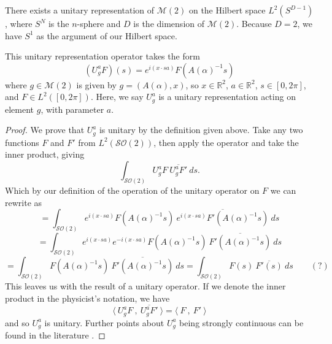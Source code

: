 \documentclass{article}
\begin{document}
\begin{theorem}
    There exists a unitary representation of $\mathcal{M}(2)$ on the Hilbert space ${L}^{2}(S^{D-1})$, where $S^{N}$ is the $n$-sphere and $D$ is the dimension of $\mathcal{M}(2)$. Because $D=2$, we have $S^{1}$ as the argument of our Hilbert space.

    This unitary representation operator takes the form
    \[%
        (U^{a}_{g}F)(s) = e^{i(x \cdot sa)}F(A(\alpha)^{-1}s)
    \]%
    where $g \in \mathcal{M}(2)$ is given by $g = (A(\alpha), x)$, so $x \in \mathbb{R}^{2}$, $a \in \mathbb{R}^{2}$, $s \in [0,2\pi]$,  and $F \in L^{2}([0,2\pi])$. Here, we say $U^{a}_{g}$ is a unitary representation acting on element $g$, with parameter $a$. 
\end{theorem}
\begin{proof}
    We prove that $U^{a}_{g}$ is unitary by the definition given above.
    Take any two functions $F$ and $F'$ from $L^{2}(\mathcal{SO}(2))$, then apply the operator and take the inner product, giving
    \[%
        \int_{\mathcal{SO}(2)} U^{a}_{g}F\ \overline{U^{a}_{g}F'} \ ds
    .\]%
    Which by our definition of the operation of the unitary operator on $F$ we can rewrite as 
    \[%
        =
        \int_{\mathcal{SO}(2)} 
        e^{i(x \cdot sa)}F(A(\alpha)^{-1}s) \
        \overline{e^{i(x \cdot sa)}F'(A(\alpha)^{-1}s)}
        \ ds
    \]%
    \[%
        =
        \int_{\mathcal{SO}(2)} 
        e^{i(x \cdot sa)} e^{-i(x \cdot sa)} 
        F(A(\alpha)^{-1}s) \
        \overline{F'(A(\alpha)^{-1}s)}
        \ ds
    \]%
    \[%
        =
        \int_{\mathcal{SO}(2)} 
        F(A(\alpha)^{-1}s) \
        \overline{F'(A(\alpha)^{-1}s)}
        \ ds
        =
        \int_{\mathcal{SO}(2)} 
        F(s) \
        \overline{F'(s)}
        \ ds \qquad(?)
    \]%
    This leaves us with the result of a unitary operator. If we denote the inner product in the physicist's notation, we have
    \[%
        \langle  \ U^{a}_{g}F\ , \ \overline{U^{a}_{g}F'} \ \rangle
        =
        \langle \ F \ , \  F'\  \rangle
    \]%
    and so $U^{a}_{g}$ is unitary. Further points about $U^{a}_{g}$ being strongly continuous can be found in the literature \cite{sugiura}.
\end{proof}
\end{document}

